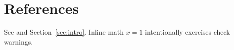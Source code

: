\section{References}
\label{sec:child}
See \cite{knuth1984} and Section~\ref{sec:intro}.
Inline math $x=1$ intentionally exercises check warnings.
